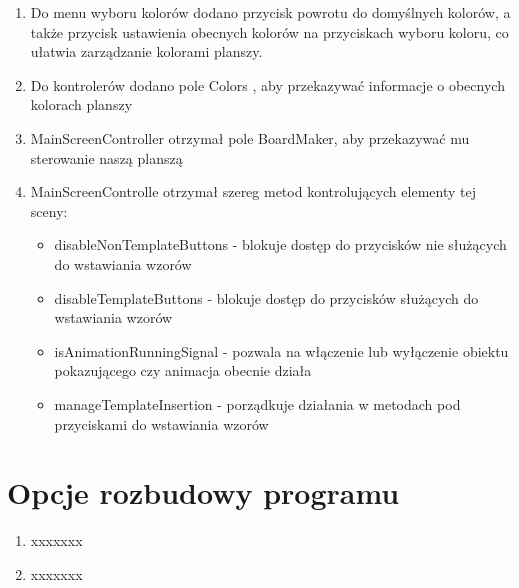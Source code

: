 \documentclass[a4paper,11pt]{article}
\begin{document}
\begin{enumerate}
\item Do menu wyboru kolorów dodano przycisk powrotu do domyślnych kolorów, a także przycisk ustawienia obecnych kolorów na przyciskach wyboru koloru, co ułatwia zarządzanie kolorami planszy.
\item Do kontrolerów dodano pole Colors , aby przekazywać informacje o obecnych kolorach planszy
\item MainScreenController otrzymał pole BoardMaker, aby przekazywać mu sterowanie naszą planszą
\item MainScreenControlle otrzymał szereg metod kontrolujących elementy tej sceny:
	\begin{itemize}
	\item disableNonTemplateButtons - blokuje dostęp do przycisków nie służących do wstawiania wzorów
	\item disableTemplateButtons - blokuje dostęp do przycisków służących do wstawiania wzorów
	\item isAnimationRunningSignal - pozwala na włączenie lub wyłączenie obiektu pokazującego czy animacja obecnie działa
	\item manageTemplateInsertion - porządkuje działania w metodach pod przyciskami do wstawiania wzorów
	\end{itemize}
\end{enumerate}
\section{Opcje rozbudowy programu}
\begin{enumerate}

\item xxxxxxx

\item xxxxxxx

\end{enumerate}
\end{document}

